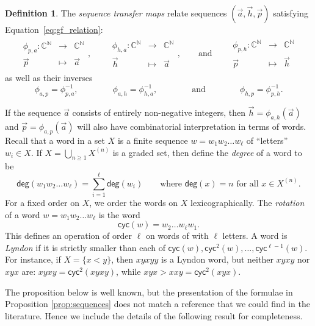 \documentclass[11pt]{amsart}
\theoremstyle{definition}
\newtheorem{definition}[theorem]{Definition}
\numberwithin{equation}{section}
\def\NN{{\mathbb N}}
\def\CC{{\mathbb C}}
\begin{document}
\begin{definition}
The \emph{sequence transfer maps} relate sequences $(\vec{a}, \vec{h}, \vec{p})$ satisfying Equation~\eqref{eq:gf_relation}:
\begin{align*}
\begin{array}{rcl}
\phi_{p, a} : \CC^{\NN} & \to & \CC^{\NN} \\
\vec{p} & \mapsto & \vec{a}
\end{array},
\qquad
\begin{array}{rcl}
\phi_{h, a} : \CC^{\NN} & \to & \CC^{\NN} \\
\vec{h} & \mapsto & \vec{a}
\end{array},
\qquad\text{and}\qquad 
\begin{array}{rcl}
\phi_{p, h} : \CC^{\NN} & \to & \CC^{\NN} \\
\vec{p} & \mapsto & \vec{h}
\end{array}
\end{align*}
as well as their inverses
\[
\phi_{a, p} = \phi_{p, a}^{-1},
\qquad\qquad
\phi_{a, h} = \phi_{h, a}^{-1},
\qquad\qquad\text{and}\qquad\qquad
\phi_{h, p} = \phi_{p, h}^{-1}.
\]
\end{definition}

If the sequence $\vec{a}$ consists of entirely non-negative integers,
then $\vec{h} = \phi_{a, h}(\vec{a})$ and $\vec{p} = \phi_{a, p}(\vec{a})$ will also have combinatorial interpretation in terms of words.
Recall that a word in a set $X$ is a finite sequence $w = w_{1} w_{2} \ldots w_{\ell}$ of ``letters'' $w_{i} \in X$.  
If $X = \bigcup_{n \geq 1} X^{(n)}$ is a graded set, then define the \emph{degree} of a word to be
\[
\mathsf{deg}(w_1 w_2 \ldots w_{\ell}) = \sum_{i = 1}^{\ell} \mathsf{deg}(w_{i})
\qquad\text{where $\mathsf{deg}(x) = n$ for all $x \in X^{(n)}$}.
\]
For a fixed order on $X$, we order the words on $X$ lexicographically.  
The \emph{rotation} of a word $w = w_{1} w_{2} \ldots w_{\ell}$ is the word
\[
\mathsf{cyc}(w) =  w_{2} \ldots w_{\ell} w_{1}.
\]
This defines an operation of order $\ell$ on words of with $\ell$ letters.  
A word is \emph{Lyndon} if it is strictly smaller than each of $\mathsf{cyc}(w), \mathsf{cyc}^{2}(w), \ldots, \mathsf{cyc}^{\ell-1}(w)$.  
For instance, if $X = \{x < y\}$, then $xyxyy$ is a Lyndon word, but neither $xyxy$ nor $xyx$ are: $xyxy = \mathsf{cyc}^{2}(xyxy)$, while $xyx > xxy = \mathsf{cyc}^{2}(xyx)$.

The proposition below is well known, but the presentation of the
formulae in Proposition \ref{prop:sequences} does not match a reference that
we could find in the literature.  Hence we include the details of the
following result for completeness.
\end{document}
